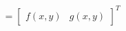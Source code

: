 \documentclass[preview]{standalone}
\begin{document}
\begin{align*}
= \begin{bmatrix} f(x,y) & g(x,y) \end{bmatrix}^T
\end{align*}
\end{document}
